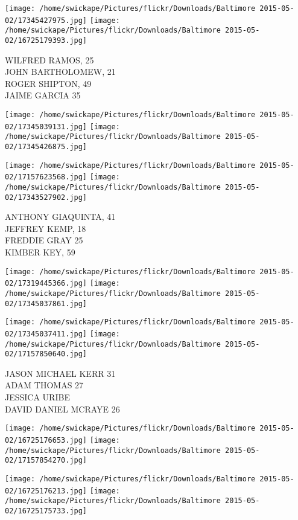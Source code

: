 \documentclass[10pt,letterpaper]{article}
\begin{document}
\texttt{[image: /home/swickape/Pictures/flickr/Downloads/Baltimore 2015-05-02/17345427975.jpg]}
\texttt{[image: /home/swickape/Pictures/flickr/Downloads/Baltimore 2015-05-02/16725179393.jpg]}

WILFRED RAMOS, 25\\
JOHN BARTHOLOMEW, 21\\
ROGER SHIPTON, 49\\
JAIME GARCIA 35\\
\pagebreak

\texttt{[image: /home/swickape/Pictures/flickr/Downloads/Baltimore 2015-05-02/17345039131.jpg]}
\texttt{[image: /home/swickape/Pictures/flickr/Downloads/Baltimore 2015-05-02/17345426875.jpg]}

\texttt{[image: /home/swickape/Pictures/flickr/Downloads/Baltimore 2015-05-02/17157623568.jpg]}
\texttt{[image: /home/swickape/Pictures/flickr/Downloads/Baltimore 2015-05-02/17343527902.jpg]}

ANTHONY GIAQUINTA, 41\\
JEFFREY KEMP, 18\\
FREDDIE GRAY 25\\
KIMBER KEY, 59\\
\pagebreak

\texttt{[image: /home/swickape/Pictures/flickr/Downloads/Baltimore 2015-05-02/17319445366.jpg]}
\texttt{[image: /home/swickape/Pictures/flickr/Downloads/Baltimore 2015-05-02/17345037861.jpg]}

\texttt{[image: /home/swickape/Pictures/flickr/Downloads/Baltimore 2015-05-02/17345037411.jpg]}
\texttt{[image: /home/swickape/Pictures/flickr/Downloads/Baltimore 2015-05-02/17157850640.jpg]}

JASON MICHAEL KERR 31\\
ADAM THOMAS 27\\
JESSICA URIBE\\
DAVID DANIEL MCRAYE 26\\
\pagebreak

\texttt{[image: /home/swickape/Pictures/flickr/Downloads/Baltimore 2015-05-02/16725176653.jpg]}
\texttt{[image: /home/swickape/Pictures/flickr/Downloads/Baltimore 2015-05-02/17157854270.jpg]}

\texttt{[image: /home/swickape/Pictures/flickr/Downloads/Baltimore 2015-05-02/16725176213.jpg]}
\texttt{[image: /home/swickape/Pictures/flickr/Downloads/Baltimore 2015-05-02/16725175733.jpg]}
\end{document}
